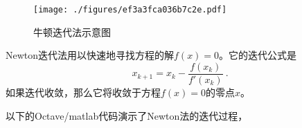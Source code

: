 

\begin{figure}[ht]
\centering
\texttt{[image: ./figures/ef3a3fca036b7c2e.pdf]}
\caption{牛顿迭代法示意图} \label{fig_NWTNRT_1}
\end{figure}

Newton迭代法用以快速地寻找方程的解$f(x)=0$。它的迭代公式是
\begin{equation}
x_{k+1} = x_k-\frac{f(x_k)}{f'(x_k)}~.
\end{equation}
如果迭代收敛，那么它将收敛于方程$f(x)=0$的零点$x$。

以下的Octave/matlab代码演示了Newton法的迭代过程，